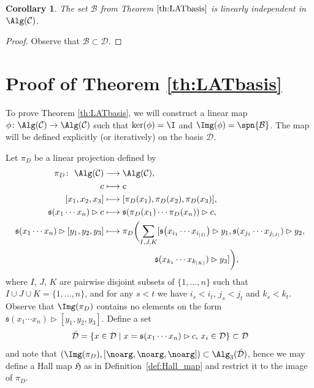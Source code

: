 \documentclass[pdftex]{sigma}
\numberwithin{equation}{section}
\newtheorem{Corollary}[Theorem]{Corollary}
\begin{document}
\begin{Corollary}\label{cor:B_lin_ind}
 The set $\mathcal{B}$ from Theorem $\ref{th:LATbasis}$ is linearly independent in $\Alg(\mathcal{C})$.
\end{Corollary}

\begin{proof}
 Observe that $\mathcal{B} \subset \mathcal{D}$.
\end{proof}


\section{Proof of Theorem \ref{th:LATbasis}}\label{sec:proof}

To prove Theorem \ref{th:LATbasis}, we will construct a linear map $\phi \colon \Alg(\mathcal{C}) \rightarrow \Alg(\mathcal{C})$ such that $\ker(\phi) = \I$ and $\Img(\phi)= \spn\{\mathcal{B}\}$. The map will be defined explicitly (or iteratively) on the basis $\mathcal{D}$.

Let $\pi_D$ be a linear projection defined by
\begin{align*}
 \pi_D \colon \ \Alg(\mathcal{C}) &\longrightarrow \Alg(\mathcal{C}), \\
 c & \longmapsto c \\ %
 [x_1, x_2 ,x_3] &\longmapsto [\pi_D(x_1),\pi_D(x_2),\pi_D(x_3)], \\
 \mathfrak{s}(x_1 \cdots x_n) \rhd c &\longmapsto \mathfrak{s}(\pi_D(x_1) \cdots \pi_D(x_n)) \rhd c , \\
 \mathfrak{s}(x_1 \cdots x_n) \rhd [y_1, y_2, y_3] &\longmapsto \pi_D \biggl( \sum_{I,J,K} [\mathfrak{s}\bigl(x_{i_1} \cdots x_{i_{|I|}}\bigr) \rhd y_1, \mathfrak{s}(x_{j_1} \cdots x_{j_{|J|}}) \rhd y_2,\\
 & \hphantom{\longmapsto \pi_D \biggl( \sum_{I,J,K}} \mathfrak{s}(x_{k_1} \cdots x_{k_{|K|}}) \rhd y_3] \biggr),
\end{align*}
where $I$, $J$, $K$ are pairwise disjoint subsets of $\{1, \dots , n\}$ such that $I \cup J \cup K = \{1, \dots , n \}$, and for any $s < t$ we have $i_s < i_t$, $j_s < j_t$ and $k_s < k_t$. Observe that $\Img(\pi_D)$ contains no elements on the form $\mathfrak{s}(x_1 \cdots x_n) \rhd [y_1,y_2,y_3]$. Define a set
\[
\Bar{\mathcal{D}} = \{ x \in \mathcal{D} \mid x = \mathfrak{s}(x_1 \cdots x_n) \rhd c , \, x_i \in \mathcal{D} \} \subset \mathcal{D}
\]
and note that $(\Img(\pi_D), [\noarg,\noarg,\noarg]) \subset \Alg_3(\Bar{\mathcal{D}})$, hence we may define a Hall map $\mathfrak{H}$ as in Definition~\ref{def:Hall_map} and restrict it to the image of $\pi_D$.
\end{document}

